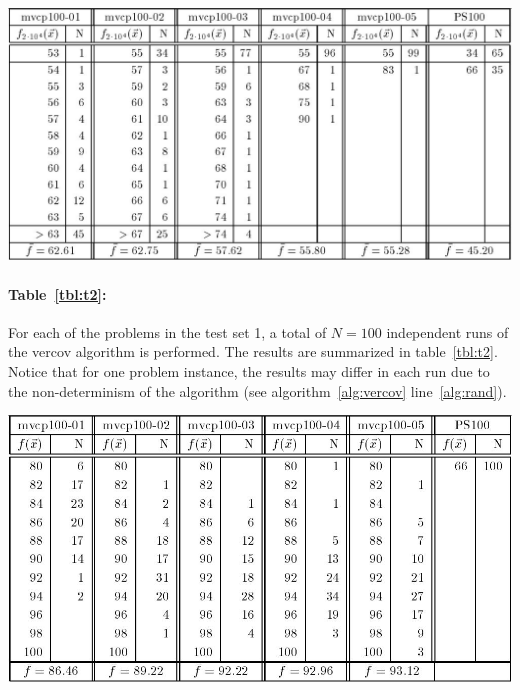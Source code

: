 \documentclass[12pt]{article}
\begin{document}
\begin{table}[!htbp]
\centering
\includegraphics[width=1\textwidth]{t1}
\caption{%
Experimental results obtained by the genetic algorithm for five random graphs of size $n = 100$ with edge density: $d = 0.1$ (``mvcp100-01''), $d = 0.2$ (``mvcp100-02''), $d = 0.3$ (``mvcp100-03''), $d = 0.5$ (``mvcp100-04''), $d = 0.5$ (``mvcp100-05'') and the regular graph of size $n = 100 \ (k=32)$ from Papadimitriou and Steiglitz (``PS100'').%
}
\label{tbl:t1}
\end{table}

\paragraph{Table~\ref{tbl:t2}:}
For each of the problems in the test set 1, a total of $N=100$
independent runs of the vercov algorithm is performed.
The results are summarized in table~\ref{tbl:t2}.
Notice that for one problem instance, the results may differ in each run due to the
non-determinism of the algorithm (see algorithm~\ref{alg:vercov} line~\ref{alg:rand}).

\begin{table}[!htbp]
\centering
\includegraphics[width=1\textwidth]{t2}
\caption{%
Experimental results obtained by the vercov algorithm for five random graphs of size $n = 100$ with edge density: $d = 0.1$ (``mvcp100-01''), $d = 0.2$ (``mvcp100-02''), $d = 0.3$ (``mvcp100-03''), $d = 0.5$ (``mvcp100-04''), $d = 0.5$ (``mvcp100-05'') and the regular graph of size $n = 100 \ (k=32)$ from Papadimitriou and Steiglitz (``PS100'').%
}
\label{tbl:t2}
\end{table}
\end{document}
